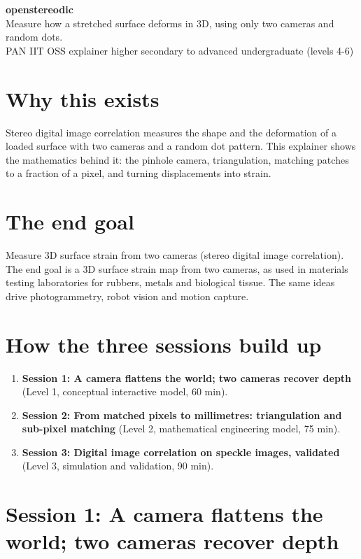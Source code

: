 \documentclass[11pt,a4paper]{article}
\begin{document}
\begin{center}{\LARGE\bfseries openstereodic}\\[0.4em]{\large Measure how a stretched surface deforms in 3D, using only two cameras and random dots.}\\[0.2em]\small PAN IIT OSS explainer \textbullet{} higher secondary to advanced undergraduate (levels 4-6)\end{center}

\section*{Why this exists}
Stereo digital image correlation measures the shape and the deformation of a loaded surface with two cameras and a random dot pattern. This explainer shows the mathematics behind it: the pinhole camera, triangulation, matching patches to a fraction of a pixel, and turning displacements into strain.

\section*{The end goal}
Measure 3D surface strain from two cameras (stereo digital image correlation). The end goal is a 3D surface strain map from two cameras, as used in materials testing laboratories for rubbers, metals and biological tissue. The same ideas drive photogrammetry, robot vision and motion capture.

\section*{How the three sessions build up}
\begin{enumerate}[nosep]
\item \textbf{Session 1: A camera flattens the world; two cameras recover depth} (Level 1, conceptual interactive model, 60 min).
\item \textbf{Session 2: From matched pixels to millimetres: triangulation and sub-pixel matching} (Level 2, mathematical engineering model, 75 min).
\item \textbf{Session 3: Digital image correlation on speckle images, validated} (Level 3, simulation and validation, 90 min).
\end{enumerate}

\section{Session 1: A camera flattens the world; two cameras recover depth}
\end{document}
